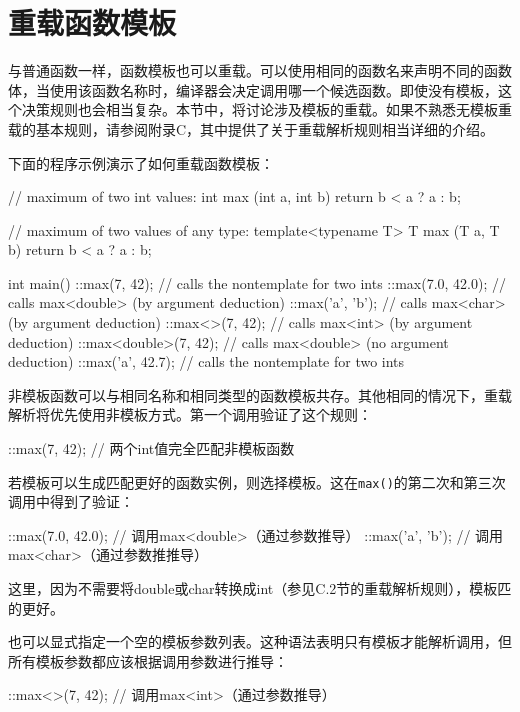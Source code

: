 \section{重载函数模板}

与普通函数一样，函数模板也可以重载。可以使用相同的函数名来声明不同的函数体，当使用该函数名称时，编译器会决定调用哪一个候选函数。即使没有模板，这个决策规则也会相当复杂。本节中，将讨论涉及模板的重载。如果不熟悉无模板重载的基本规则，请参阅附录C，其中提供了关于重载解析规则相当详细的介绍。

下面的程序示例演示了如何重载函数模板：

\begin{cpp}
// maximum of two int values:
int max (int a, int b)
{
	return b < a ? a : b;
}

// maximum of two values of any type:
template<typename T>
T max (T a, T b)
{
	return b < a ? a : b;
}

int main()
{
	::max(7, 42); // calls the nontemplate for two ints
	::max(7.0, 42.0); // calls max<double> (by argument deduction)
	::max('a', 'b'); // calls max<char> (by argument deduction)
	::max<>(7, 42); // calls max<int> (by argument deduction)
	::max<double>(7, 42); // calls max<double> (no argument deduction)
	::max('a', 42.7); // calls the nontemplate for two ints
}
\end{cpp}

非模板函数可以与相同名称和相同类型的函数模板共存。其他相同的情况下，重载解析将优先使用非模板方式。第一个调用验证了这个规则：

\begin{cpp}
::max(7, 42); // 两个int值完全匹配非模板函数
\end{cpp}

若模板可以生成匹配更好的函数实例，则选择模板。这在\texttt{max()}的第二次和第三次调用中得到了验证：

\begin{cpp}
::max(7.0, 42.0); // 调用max<double>（通过参数推导）
::max('a', 'b'); // 调用max<char>（通过参数推推导）
\end{cpp}

这里，因为不需要将double或char转换成int（参见C.2节的重载解析规则），模板匹的更好。

也可以显式指定一个空的模板参数列表。这种语法表明只有模板才能解析调用，但所有模板参数都应该根据调用参数进行推导：

\begin{cpp}
::max<>(7, 42); // 调用max<int>（通过参数推导）
\end{cpp}

